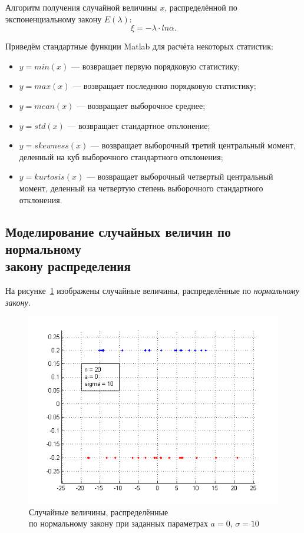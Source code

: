 Алгоритм получения случайной величины $ x $, распределённой по экспоненциальному
закону $ E (\lambda) $:
$$
  \xi = -\lambda \cdot ln \alpha.
$$

Приведём стандартные функции Matlab для расчёта некоторых статистик:

\begin{itemize}
  \item $ y = min (x) $ --- возвращает первую порядковую статистику;
  \item $ y = max(x) $ --- возвращает последнюю порядковую статистику;
  \item $ y = mean (x) $ --- возвращает выборочное среднее;
  \item $ y = std (x) $ --- возвращает стандартное отклонение;
  \item $ y = skewness (x) $ --- возвращает выборочный третий центральный момент,
    деленный на куб выборочного стандартного отклонения;
  \item $ y = kurtosis (x) $ --- возвращает выборочный четвертый центральный момент,
    деленный на четвертую степень выборочного стандартного отклонения.
\end{itemize}

\newpage

\subsection{Моделирование случайных величин по нормальному \\ закону распределения}

На рисунке~\ref{pic:normal} изображены случайные величины, распределённые
по \textit{нормальному закону}.
\begin{figure}[h!]
  \centering
  \includegraphics[width=1\linewidth]{pic/normal}
  \caption{Случайные величины, распределённые \\ по нормальному закону при заданных параметрах $ a = 0 $, $ \sigma = 10 $}
  \label{pic:normal}
\end{figure}

